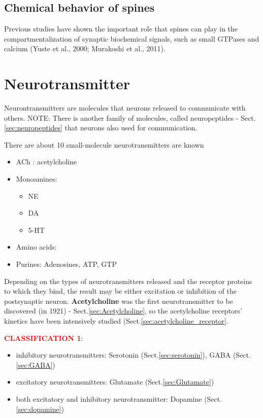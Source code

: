 \subsection{Chemical behavior of spines}

Previous studies have shown the important role that spines can play in the
compartmentalization of synaptic biochemical signals, such as small GTPases and
calcium (Yuste et al., 2000; Murakoshi et al., 2011).



\section{Neurotransmitter}
\label{sec:neurotransmitter}

Neurontransmitters are molecules that neurons released to communicate with
others. NOTE: There is another family of molecules, called neuropeptides -
Sect.\ref{sec:neuropeptides} that neurons also used for communication.

There are about 10 small-molecule neurotransmitters are known
\begin{itemize}
\item ACh : acetylcholine
\item Monoamines:
\begin{itemize}
\item NE
\item DA
\item 5-HT
\end{itemize}
\item Amino acids:
\item Purines: Adenosines, ATP, GTP
\end{itemize}

Depending on the types of neurotransmitters released and the receptor proteins
to which they bind, the result may be either excitation or inhibition of the
postsynaptic neuron. {\bf Acetylcholine} was the first neurotransmitter to be
discovered (in 1921) - Sect.\ref{sec:Acetylcholine}, so the acetylcholine
receptors' kinetics have been intensively studied
(Sect.\ref{sec:acetylcholine_receptor}.

\textcolor{red}{\bf CLASSIFICATION 1}:
\begin{itemize}
  \item inhibitory neurotransmitters: Serotonin (Sect.\ref{sec:serotonin}), GABA
  (Sect.\ref{sec:GABA})
  
  \item excitatory neurotransmitters: Glutamate (Sect.\ref{sec:Glutamate})
  
  \item both excitatory and inhibitory neurotransmitter: Dopamine
  (Sect.\ref{sec:dopamine})
\end{itemize}

